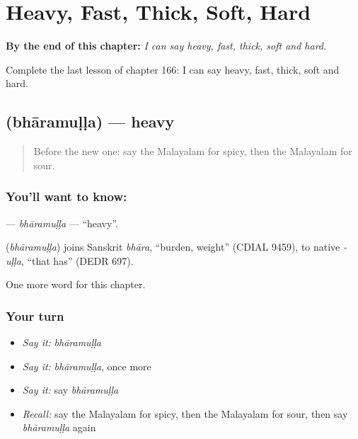 
\chapter{Heavy, Fast, Thick, Soft, Hard}
\label{ch:ml-heavy-fast-thick-soft-hard}

\begin{chapteropening}
\textbf{By the end of this chapter:} \emph{I can say heavy, fast, thick, soft and hard.}

Complete the last lesson of chapter 166: I can say heavy, fast, thick, soft and hard.
\end{chapteropening}

\section[\texorpdfstring{\ml{ഭാരമുള്ള} (bhāramuḷḷa)}{ഭാരമുള്ള (bhāramuḷḷa)}]{ (bhāramuḷḷa) — heavy}

\label{lesson:ML-C166-bharamulla}



\begin{quote}
Before the new one: say the Malayalam for spicy, then the Malayalam for sour.
\end{quote}

\subsection*{You'll want to know: }
\textbf{} — \emph{bhāramuḷḷa} — \textquotedblleft{}heavy\textquotedblright{}.

\begin{cousinweb}
\textbf{} (\emph{bhāramuḷḷa}) joins Sanskrit \emph{bhāra}, \textquotedblleft{}burden, weight\textquotedblright{} (CDIAL 9459), to native \emph{-uḷḷa}, \textquotedblleft{}that has\textquotedblright{} (DEDR 697).
\end{cousinweb}

\begin{grammarlens}[title={What you've built}]
One more word for this chapter.
\end{grammarlens}

\subsection*{Your turn}
\begin{itemize}
\raggedright
  \item \emph{Say it:} \emph{bhāramuḷḷa}
  \item \emph{Say it:} \emph{bhāramuḷḷa}, once more
  \item \emph{Say it:} say \emph{bhāramuḷḷa}
  \item \emph{Recall:} say the Malayalam for spicy, then the Malayalam for sour, then say \emph{bhāramuḷḷa} again
\end{itemize}

